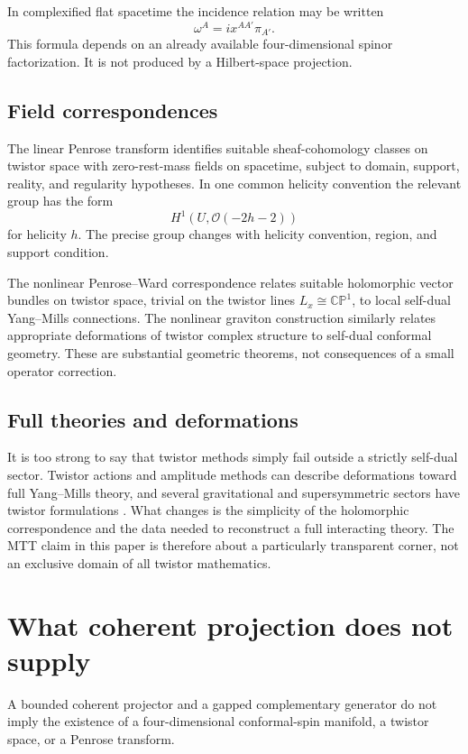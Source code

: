 \documentclass[11pt]{article}
\newcommand{\cO}{\mathcal{O}}
\begin{document}
In complexified flat spacetime the incidence relation may be written
\[
\omega^A=i x^{AA'}\pi_{A'}.
\]
This formula depends on an already available four-dimensional spinor
factorization. It is not produced by a Hilbert-space projection.

\subsection{Field correspondences}

The linear Penrose transform identifies suitable sheaf-cohomology classes on
twistor space with zero-rest-mass fields on spacetime, subject to domain,
support, reality, and regularity hypotheses. In one common helicity
convention the relevant group has the form
\[
H^1(U,\cO(-2h-2))
\]
for helicity \(h\). The precise group changes with helicity convention,
region, and support condition.

The nonlinear Penrose--Ward correspondence relates suitable holomorphic
vector bundles on twistor space, trivial on the twistor lines
\(L_x\cong\mathbb{CP}^1\), to local self-dual Yang--Mills connections. The
nonlinear graviton construction similarly relates appropriate deformations
of twistor complex structure to self-dual conformal geometry. These are
substantial geometric theorems, not consequences of a small operator
correction.

\subsection{Full theories and deformations}

It is too strong to say that twistor methods simply fail outside a strictly
self-dual sector. Twistor actions and amplitude methods can describe
deformations toward full Yang--Mills theory, and several gravitational and
supersymmetric sectors have twistor formulations
\cite{Mason2005,MasonWolf2009,AtiyahDunajskiMason2017}.
What changes is the simplicity of the holomorphic correspondence and the
data needed to reconstruct a full interacting theory. The MTT claim in this
paper is therefore about a particularly transparent corner, not an exclusive
domain of all twistor mathematics.

\section{What coherent projection does not supply}

\begin{proposition}
\label{prop:no-geometry}
A bounded coherent projector and a gapped complementary generator do not
imply the existence of a four-dimensional conformal-spin manifold, a twistor
space, or a Penrose transform.
\end{proposition}
\end{document}
